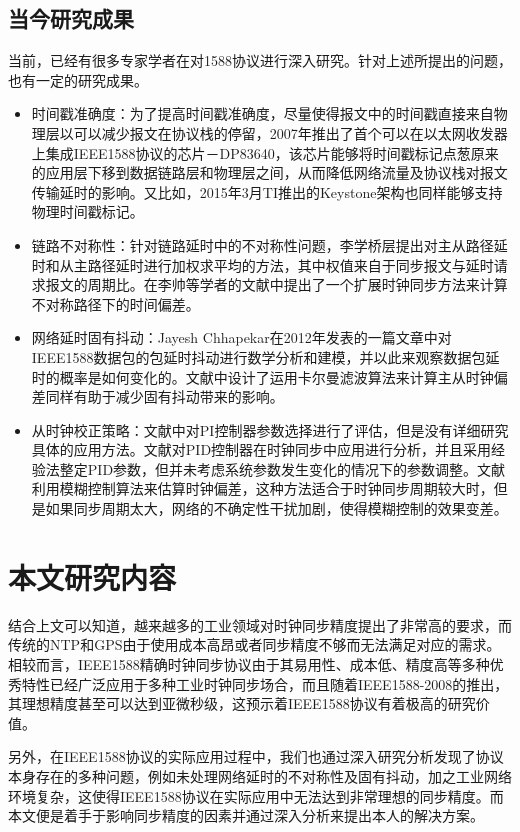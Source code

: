 \subsection{当今研究成果}
\label{sec:1588_problem_research}
当前，已经有很多专家学者在对1588协议进行深入研究。针对上述所提出的问题，也有一定的研究成果。
\begin{itemize}[noitemsep,topsep=0pt,parsep=0pt,partopsep=0pt]
	\item 时间戳准确度：为了提高时间戳准确度，尽量使得报文中的时间戳直接来自物理层以可以减少报文在协议栈的停留，2007年推出了首个可以在以太网收发器上集成IEEE1588协议的芯片－DP83640\supercite{4}，该芯片能够将时间戳标记点葱原来的应用层下移到数据链路层和物理层之间，从而降低网络流量及协议栈对报文传输延时的影响。又比如，2015年3月TI推出的Keystone架构也同样能够支持物理时间戳标记\supercite{5}。
	\item 链路不对称性：针对链路延时中的不对称性问题，李学桥层提出对主从路径延时和从主路径延时进行加权求平均的方法，其中权值来自于同步报文与延时请求报文的周期比\supercite{6}。在李帅等学者的文献\parencite{7}中提出了一个扩展时钟同步方法来计算不对称路径下的时间偏差。
	\item 网络延时固有抖动：Jayesh Chhapekar在2012年发表的一篇文章中对IEEE1588数据包的包延时抖动进行数学分析和建模，并以此来观察数据包延时的概率是如何变化的\supercite{8}。文献\parencite{9}中设计了运用卡尔曼滤波算法来计算主从时钟偏差同样有助于减少固有抖动带来的影响。
	\item 从时钟校正策略：文献\parencite{10}中对PI控制器参数选择进行了评估，但是没有详细研究具体的应用方法。文献\parencite{11}对PID控制器在时钟同步中应用进行分析，并且采用经验法整定PID参数，但并未考虑系统参数发生变化的情况下的参数调整。文献\parencite{12}利用模糊控制算法来估算时钟偏差，这种方法适合于时钟同步周期较大时，但是如果同步周期太大，网络的不确定性干扰加剧，使得模糊控制的效果变差。
\end{itemize}

\section{本文研究内容}
结合上文可以知道，越来越多的工业领域对时钟同步精度提出了非常高的要求，而传统的NTP和GPS由于使用成本高昂或者同步精度不够而无法满足对应的需求。相较而言，IEEE1588精确时钟同步协议由于其易用性、成本低、精度高等多种优秀特性已经广泛应用于多种工业时钟同步场合，而且随着IEEE1588-2008的推出，其理想精度甚至可以达到亚微秒级，这预示着IEEE1588协议有着极高的研究价值。

另外，在IEEE1588协议的实际应用过程中，我们也通过深入研究分析发现了协议本身存在的多种问题，例如未处理网络延时的不对称性及固有抖动，加之工业网络环境复杂，这使得IEEE1588协议在实际应用中无法达到非常理想的同步精度。而本文便是着手于影响同步精度的因素并通过深入分析来提出本人的解决方案。

